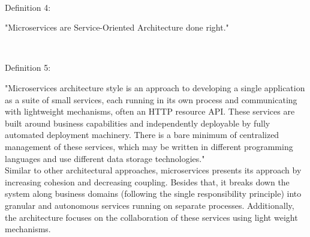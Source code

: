 \\
\begin{shaded}Definition 4: \cite{Fowler:2014aa}\cite{Radchenko:2015aa}\end{shaded}
"Microservices are Service-Oriented Architecture done right."


\\
\begin{shaded}Definition 5: \cite{Fowler:2014aa}\end{shaded}
"Microservices architecture style is an approach to developing a single application as a suite of small services, each running in its own process and communicating with lightweight mechanisms, often an HTTP resource API. These services are built around business capabilities and independently deployable by fully automated deployment machinery. There is a bare minimum of centralized management of these services, which may be written in different programming languages and use different data storage technologies."
\\
Similar to other architectural approaches, microservices presents its approach by increasing cohesion and decreasing coupling. Besides that, it breaks down the system along business domains (following the single responsibility principle) into granular and autonomous services running on separate processes. Additionally, the architecture focuses on the collaboration of these services using light weight mechanisms.


